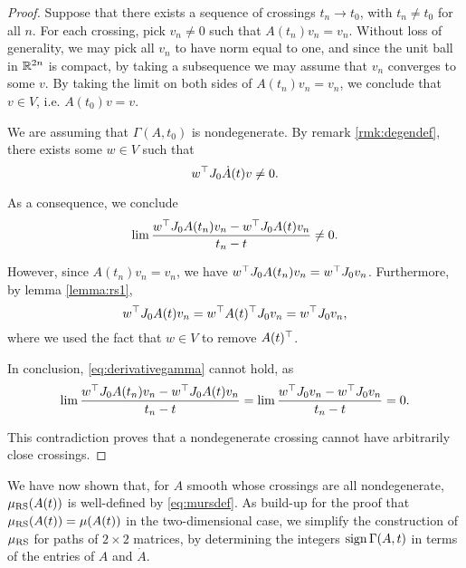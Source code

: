 \begin{proof}
Suppose that there exists a sequence of crossings $t_n \to t_0$, with $t_n \neq t_0$ for all $n$. For each crossing, pick $v_n \neq 0$ such that $A(t_n) v_n = v_n$. Without loss of generality, we may pick all $v_n$ to have norm equal to one, and since the unit ball in $\mathbb{R}^{2n}$ is compact, by taking a subsequence we may assume that $v_n$ converges to some $v$. By taking the limit on both sides of $A(t_n) v_n = v_n$, we conclude that $v \in V$, i.e. $A(t_0) v = v$.

We are assuming that $\Gamma(A,t_0)$ is nondegenerate. By remark \ref{rmk:degendef}, there exists some $w \in V$ such that
\begin{equation}
w^\top J_0 \dot A(t) v \neq 0.
\end{equation}

As a consequence, we conclude
\begin{equation}\label{eq:derivativegamma}
\lim \frac{w^\top J_0 A(t_n) v_n - w^\top J_0 A(t) v_n}{t_n - t} \neq 0.
\end{equation}

However, since $A(t_n) v_n = v_n$, we have $w^\top J_0 A(t_n) v_n = w^\top J_0 v_n$. Furthermore, by lemma \ref{lemma:rs1},
\begin{equation}
w^\top J_0 A(t) v_n = w^\top A(t)^\top J_0 v_n = w^\top J_0 v_n,
\end{equation}
where we used the fact that $w \in V$ to remove $A(t)^\top$.

In conclusion, \eqref{eq:derivativegamma} cannot hold, as
\begin{equation}
\lim \frac{w^\top J_0 A(t_n) v_n - w^\top J_0 A(t) v_n}{t_n - t} = \lim \frac{w^\top J_0 v_n - w^\top J_0 v_n}{t_n - t} = 0.
\end{equation}

This contradiction proves that a nondegenerate crossing cannot have arbitrarily close crossings.
\end{proof}

We have now shown that, for $A$ smooth whose crossings are all nondegenerate, $\mu_{\mathrm{RS}}(A(t))$ is well-defined by \eqref{eq:mursdef}. As build-up for the proof that $\mu_{\mathrm{RS}}(A(t)) = \mu(A(t))$ in the two-dimensional case, we simplify the construction of $\mu_{\mathrm{RS}}$ for paths of $2\times2$ matrices, by determining the integers $\operatorname{sign} \Gamma(A,t)$ in terms of the entries of $A$ and $\dot A$.

